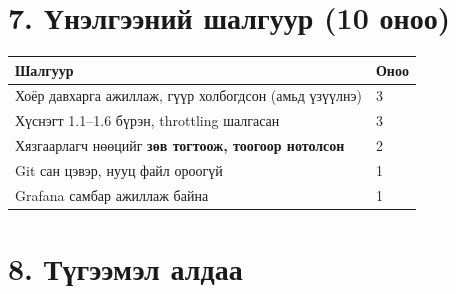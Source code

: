 \hypertarget{ux4afux43dux44dux43bux433ux44dux44dux43dux438ux439-ux448ux430ux43bux433ux443ux443ux440-10-ux43eux43dux43eux43e}{%
\section{7. Үнэлгээний шалгуур (10 оноо)}\label{ux4afux43dux44dux43bux433ux44dux44dux43dux438ux439-ux448ux430ux43bux433ux443ux443ux440-10-ux43eux43dux43eux43e}}

\begingroup\scriptsize\begin{longtable}[]{@{}ll@{}}
\toprule
Шалгуур & Оноо\tabularnewline
\midrule
\endhead
Хоёр давхарга ажиллаж, гүүр холбогдсон (амьд үзүүлнэ) & 3\tabularnewline
Хүснэгт 1.1--1.6 бүрэн, throttling шалгасан & 3\tabularnewline
Хязгаарлагч нөөцийг \textbf{зөв тогтоож, тоогоор нотолсон} & 2\tabularnewline
Git сан цэвэр, нууц файл ороогүй & 1\tabularnewline
Grafana самбар ажиллаж байна & 1\tabularnewline
\bottomrule
\end{longtable}\endgroup

\hypertarget{ux442ux4afux433ux44dux44dux43cux44dux43b-ux430ux43bux434ux430ux430}{%
\section{8. Түгээмэл алдаа}\label{ux442ux4afux433ux44dux44dux43cux44dux43b-ux430ux43bux434ux430ux430}}

